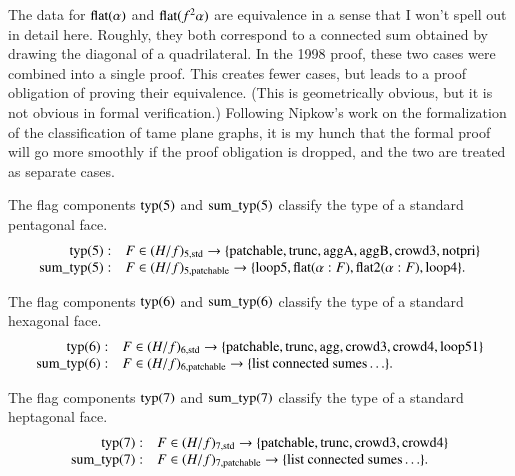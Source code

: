 \begin{remark}
The data for ${\operatorname{flat}}(\alpha)$ and ${\operatorname{flat}}(f^2\alpha)$ are
equivalence in a sense that I won't spell out in detail here.
Roughly, they both correspond to a connected sum obtained by drawing the
diagonal of a quadrilateral. In the 1998 proof, these two cases
were combined into a single proof. This creates fewer cases, but
leads to a proof obligation of proving their equivalence.  (This
is geometrically obvious, but it is not obvious in formal
verification.) Following Nipkow's work on the formalization of the
classification of tame plane graphs, it is my hunch that the
formal proof will go more smoothly if the proof obligation is
dropped, and the two are treated as separate cases.
\end{remark}

\begin{definition}
The flag components ${\operatorname{typ}}(5)$ and ${\operatorname{sum\_typ}}(5)$
classify the type of a standard pentagonal face.
    $$
    \begin{array}{rll}
    {\operatorname{typ}}(5):& F\in (H/f)_{5,{\operatorname{std}}}
    \to
    \{{\operatorname{patchable}},{\operatorname{trunc}},{\operatorname{aggA}},{\operatorname{aggB}},{\operatorname{crowd3}},{\operatorname{notpri}}\}\\
    {\operatorname{sum\_typ}}(5):& F\in (H/f)_{5,{\operatorname{patchable}}}
    \to
    \{{\operatorname{loop5}},{\operatorname{flat}}(\alpha:F),{\operatorname{flat2}}(\alpha:F),{\operatorname{loop4}}\}.
    \end{array}
    $$
\end{definition}

\begin{definition}
The flag components ${\operatorname{typ}}(6)$ and ${\operatorname{sum\_typ}}(6)$
classify the type of a standard hexagonal face.
    $$
    \begin{array}{rll}
    {\operatorname{typ}}(6):& F\in (H/f)_{6,{\operatorname{std}}}
    \to
    \{{\operatorname{patchable}},{\operatorname{trunc}},{\operatorname{agg}},{\operatorname{crowd3}},{\operatorname{crowd4}},{\operatorname{loop51}}\}\\
    {\operatorname{sum\_typ}}(6):& F\in (H/f)_{6,{\operatorname{patchable}}}
    \to
    \{\text{list connected sumes}\ldots\}.
    \end{array}
    $$
\end{definition}

\begin{definition}
The flag components ${\operatorname{typ}}(7)$ and ${\operatorname{sum\_typ}}(7)$
classify the type of a standard heptagonal face.
    $$
    \begin{array}{rll}
    {\operatorname{typ}}(7):& F\in (H/f)_{7,{\operatorname{std}}}
    \to
    \{{\operatorname{patchable}},{\operatorname{trunc}},{\operatorname{crowd3}},{\operatorname{crowd4}}\}\\
    {\operatorname{sum\_typ}}(7):& F\in (H/f)_{7,{\operatorname{patchable}}}
    \to
    \{\text{list connected sumes}\ldots\}.
    \end{array}
    $$
\end{definition}

